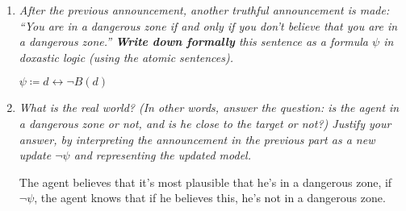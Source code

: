 \documentclass[leqno]{article}
\begin{document}
\begin{enumerate}
    \begin{center}
    \end{center}

    \item \textit{After the previous announcement, another truthful 
    announcement is made: ``You are in a dangerous zone if and only if you 
    don't believe that you are in a dangerous zone.'' \textbf{Write down 
    formally} this sentence as a formula $\psi$ in doxastic logic (using the 
    atomic sentences).}

    $\psi \coloneqq d \leftrightarrow \neg B(d)$

    \item \textit{What is the real world? (In other words, answer the question:
    is the agent in a dangerous zone or not, and is he close to the target or
    not?) Justify your answer, by interpreting the announcement in the previous
    part as a new update $\neg \psi$ and representing the updated model.}

    The agent believes that it's most plausible that he's in a dangerous zone,
    if $\neg \psi$, the agent knows that if he believes this, he's not in a
    dangerous zone.

    \begin{center}
    \end{center}

\end{enumerate}
\end{document}
